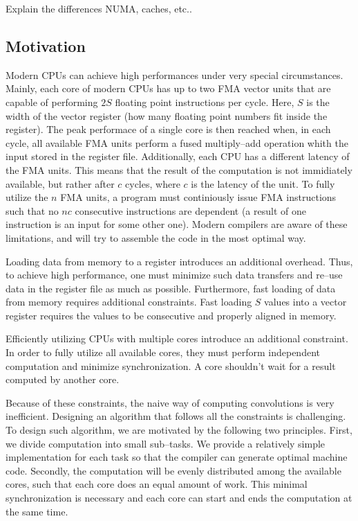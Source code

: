   Explain the differences NUMA, caches, etc..

  \subsection{Motivation}

  Modern CPUs can achieve high performances under very special
  circumstances.  Mainly, each core of modern CPUs has up to two FMA
  vector units that are capable of performing $2S$ floating point
  instructions per cycle.  Here, $S$ is the width of the vector
  register (how many floating point numbers fit inside the register).
  The peak performace of a single core is then reached when, in each
  cycle, all available FMA units perform a fused multiply--add
  operation whith the input stored in the register file.
  Additionally, each CPU has a different latency of the FMA units.
  This means that the result of the computation is not immidiately
  available, but rather after $c$ cycles, where $c$ is the latency of
  the unit.  To fully utilize the $n$ FMA units, a program must
  continiously issue FMA instructions such that no $nc$ consecutive
  instructions are dependent (a result of one instruction is an input
  for some other one).  Modern compilers are aware of these
  limitations, and will try to assemble the code in the most optimal
  way.

  Loading data from memory to a register introduces an additional
  overhead.  Thus, to achieve high performance, one must minimize such
  data transfers and re--use data in the register file as much as
  possible.  Furthermore, fast loading of data from memory requires
  additional constraints.  Fast loading $S$ values into a vector
  register requires the values to be consecutive and properly aligned
  in memory.

  Efficiently utilizing CPUs with multiple cores introduce an
  additional constraint.  In order to fully utilize all available
  cores, they must perform independent computation and minimize
  synchronization.  A core shouldn't wait for a result computed by
  another core.

  Because of these constraints, the naive way of computing
  convolutions is very inefficient.  Designing an algorithm that
  follows all the constraints is challenging.  To design such
  algorithm, we are motivated by the following two principles.  First,
  we divide computation into small sub--tasks.  We provide a
  relatively simple implementation for each task so that the compiler
  can generate optimal machine code.  Secondly, the computation will
  be evenly distributed among the available cores, such that each core
  does an equal amount of work.  This minimal synchronization is
  necessary and each core can start and ends the computation at the
  same time.
